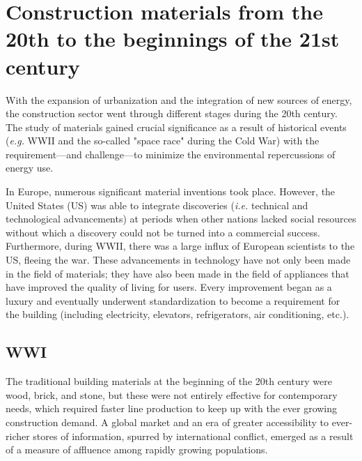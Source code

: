\section{Construction materials from the 20th to the beginnings of the 21st century}
\label{sec:construction_materials}

With the expansion of urbanization and the integration of new sources of energy, the construction sector went through different stages during the 20th century. The study of materials gained crucial significance as a result of historical events (\textit{e.g.} WWII and the so-called "space race" during the Cold War) with the requirement—and challenge—to minimize the environmental repercussions of energy use.\autocite{smil2000energy}

In Europe, numerous significant material inventions took place. However, the United States (US) was able to integrate discoveries (\textit{i.e.} technical and technological advancements) at periods when other nations lacked social resources without which a discovery could not be turned into a commercial success.\autocite{buchanan2019history} Furthermore, during WWII, there was a large influx of European scientists to the US, fleeing the war.\autocite{lepage2015atlas} These advancements in technology have not only been made in the field of materials; they have also been made in the field of appliances that have improved the quality of living for users. Every improvement began as a luxury and eventually underwent standardization to become a requirement for the building (including electricity, elevators, refrigerators, air conditioning, etc.).

\subsection{WWI}
\label{sec:wwi}

The traditional building materials at the beginning of the 20th century were wood, brick, and stone, but these were not entirely effective for contemporary needs,\autocite{jester2014twentieth} which required faster line production to keep up with the ever growing construction demand. A global market and an era of greater accessibility to ever-richer stores of information,\autocite{smil2000energy} spurred by international conflict, emerged as a result of a measure of affluence among rapidly growing populations. 


